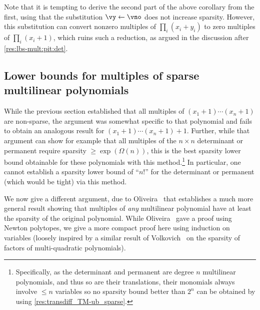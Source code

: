 \documentclass[11pt]{article}
\numberwithin{equation}{section}
\theoremstyle{definition}
\theoremstyle{plain}
\begin{document}
Note that it is tempting to derive the second part of the above corollary from the first, using that the substitution $\vy\leftarrow\vno$ does not increase sparsity.  However, this substitution can convert nonzero multiples of $\prod_i (x_i+y_i)$ to zero multiples of $\prod_i (x_i+1)$, which ruins such a reduction, as argued in the discussion after \autoref{res:lbs-mult:pit:det}.

\subsection{Lower bounds for multiples of sparse multilinear polynomials}

While the previous section established that all multiples of $(x_1+1)\cdots (x_n+1)$ are non-sparse, the argument was somewhat specific to that polynomial and fails to obtain an analogous result for $(x_1+1)\cdots (x_n+1)+1$.  Further, while that argument can show for example that all multiples of the $n\times n$ determinant or permanent require sparsity $\ge \exp(\Omega(n))$, this is the best sparsity lower bound obtainable for these polynomials with this method.\footnote{Specifically, as the determinant and permanent are degree $n$ multilinear polynomials, and thus so are their translations, their monomials always involve $\le n$ variables so no sparsity bound better than $2^n$ can be obtained by using \autoref{res:transdiff_TM-ub_sparse}.} In particular, one cannot establish a sparsity lower bound of ``$n!$'' for the determinant or permanent (which would be tight) via this method.

We now give a different argument, due to Oliveira~\cite{Oliveira15b} that establishes a much more general result showing that multiples of \emph{any} multilinear polynomial have at least the sparsity of the original polynomial.  While Oliveira~\cite{Oliveira15b} gave a proof using Newton polytopes, we give a more compact proof here using induction on variables (loosely inspired by a similar result of Volkovich~\cite{Volkovich15b} on the sparsity of factors of multi-quadratic polynomials).
\end{document}
